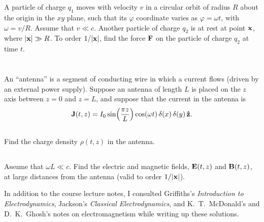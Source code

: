 \documentclass[11pt]{article}
\newcommand{\beq}{\begin{equation*}}
\newcommand{\eeq}{\end{equation*}}
\newenvironment{statement}[1]
{
	\section{#1}
	\color{darkgray}
	\ignorespaces
}
{
}
\newenvironment{problem}
{
	\subsection{}
	\color{darkgray}
    \ignorespaces
}
{

}
\begin{document}
\newcommand{\vaa}{\vb{a}}
\newcommand{\vp}{\vb{p}}
\newcommand{\vv}{\vb{v}}
\newcommand{\vx}{\vb{x}}
\newcommand{\vB}{\vb{B}}
\newcommand{\vE}{\vb{E}}
\newcommand{\vF}{\vb{F}}
\newcommand{\vJ}{\vb{J}}

\newcommand{\del}{\delta}
\newcommand{\vph}{\varphi}
\newcommand{\omg}{\omega}

\newcommand{\rhox}{\rho(x)}
\newcommand{\dcx}{\dd[3]{x}}

\newcommand{\cV}{\mathcal{V}}
\newcommand{\intcV}{\int_\cV}
\newcommand{\intS}{\int_S}
\newcommand{\dS}{\dd{S}}
\newcommand{\nh}{\vb{\hat{n}}}
\newcommand{\rh}{\vb{\hat{r}}}
\renewcommand{\xi}{x_i}
\newcommand{\limRi}{\lim_{R \to \infty}}





\renewcommand{\qq}{q_1}
\newcommand{\qw}{q_2}
\newcommand{\absx}{\abs{\vx}}

\begin{statement}{}
	A particle of charge $\qq$ moves with velocity $v$ in a circular orbit of radius $R$ about the origin in the $xy$ plane, such that its $\vph$ coordinate varies as $\vph = \omg t$, with $\omg = v / R$.  Assume that $v \ll c$.  Another particle of charge $\qw$ is at rest at point $\vx$, where $\absx \gg R$.  To order $1 / \absx$, find the force $\vF$ on the particle of charge $\qw$ at time $t$.
\end{statement}



\newcommand{\Io}{I_0}
\newcommand{\zh}{\vb{\hat{z}}}
\newcommand{\tz}{(t, z)}

\begin{statement}{}
	An ``antenna'' is a segment of conducting wire in which a current flows (driven by an external power supply).  Suppose an antenna of length $L$ is placed on the $z$ axis between $z = 0$ and $z = L$, and suppose that the current in the antenna is
	\beq
		\vJ\tz = \Io \sin(\frac{\pi z}{L}) \cos(\omg t) \,\del(x) \,\del(y) \,\zh.
	\eeq
\end{statement}

\begin{problem}
	Find the charge density $\rho\tz$ in the antenna.
\end{problem}

\begin{problem}
	Assume that $\omg L \ll c$.  Find the electric and magnetic fields, $\vE\tz$ and $\vB\tz$, at large distances from the antenna (valid to order $1 / \absx$).
\end{problem}



\vfill
{\small In addition to the course lecture notes, I consulted Griffiths's \emph{Introduction to Electrodynamics}, Jackson's \emph{Classical Electrodynamics}, and K.~T.~McDonald's and D.~K.~Ghosh's notes on electromagnetism while writing up these solutions.}
\end{document}
